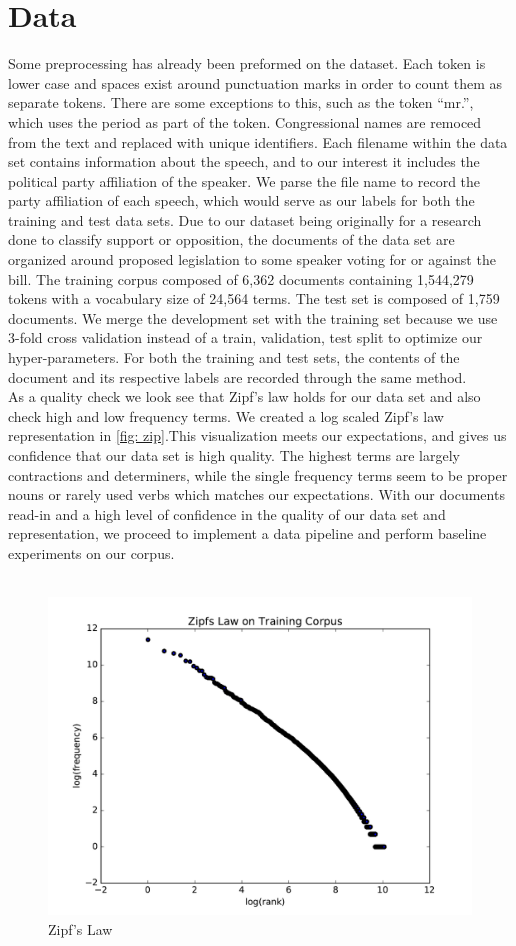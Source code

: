 \documentclass[a4paper, 12pt]{article}
\begin{document}
\section{Data}
Some preprocessing has already been preformed on the dataset. Each token is lower case and spaces exist around punctuation marks in order to count them as separate tokens. There are some exceptions to this, such as the token ``mr.'', which uses the period as part of the token. Congressional names are remoced from the text and replaced with unique identifiers. Each filename within the data set contains information about the speech, and to our interest it includes the political party affiliation of the speaker. We parse the file name to record the party affiliation of each speech, which would serve as our labels for both the training and test data sets. Due to our dataset being originally for a research done to classify support or opposition, the documents of the data set are organized around proposed legislation to some speaker voting for or against the bill. The training corpus composed of 6,362 documents containing 1,544,279 tokens with a vocabulary size of 24,564 terms. The test set is composed of 1,759 documents. We merge the development set with the training set because we use 3-fold cross validation instead of a train, validation, test split to optimize our hyper-parameters. For both the training and test sets, the contents of the document and its respective labels are recorded through the same method.\\ 

\noindent
As a quality check we look see that  Zipf's law holds for our data set and also check high and low frequency terms. We created a log scaled Zipf's law representation in \autoref{fig: zip}.This visualization meets our expectations, and gives us confidence that our data set is high quality. The highest terms are largely contractions and determiners, while the single frequency terms seem to be proper nouns or rarely used verbs which matches our expectations. With our documents read-in and a high level of confidence in the quality of our data set and representation, we proceed to implement a data pipeline and perform baseline experiments on our corpus.\\\
\begin{figure}[!ht]
\centering
\includegraphics[width=0.5\linewidth]{zipfslaw.pdf}
\caption[Zipf's Law]{Zipf's Law}
\label{fig: zip}
\end{figure}
\end{document}
